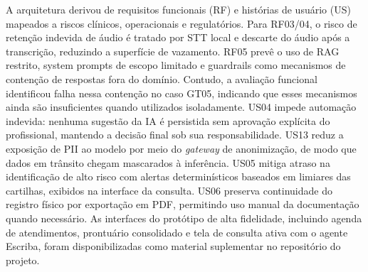 \documentclass[12pt]{article}
\begin{document}
A arquitetura derivou de requisitos funcionais (RF) e histórias de usuário (US) mapeados a riscos clínicos, operacionais e regulatórios.
Para RF03/04, o risco de retenção indevida de áudio é tratado por STT local e descarte do áudio após a transcrição, reduzindo a superfície de vazamento.
RF05 prevê o uso de RAG restrito, system prompts de escopo limitado e guardrails como mecanismos de contenção de respostas fora do domínio. Contudo, a avaliação funcional identificou falha nessa contenção no caso GT05, indicando que esses mecanismos ainda são insuficientes quando utilizados isoladamente.
US04 impede automação indevida: nenhuma sugestão da IA é persistida sem aprovação explícita do profissional, mantendo a decisão final sob sua responsabilidade.
US13 reduz a exposição de PII ao modelo por meio do \textit{gateway} de anonimização, de modo que dados em trânsito chegam mascarados à inferência.
US05 mitiga atraso na identificação de alto risco com alertas determinísticos baseados em limiares das cartilhas, exibidos na interface da consulta.
US06 preserva continuidade do registro físico por exportação em PDF, permitindo uso manual da documentação quando necessário.
As interfaces do protótipo de alta fidelidade, incluindo agenda de atendimentos, prontuário consolidado e tela de consulta ativa com o agente Escriba, foram disponibilizadas como material suplementar no repositório do projeto.
  

\end{document}
